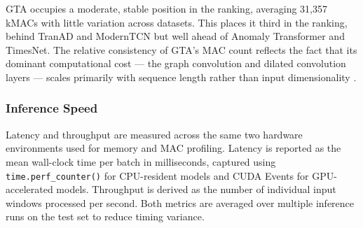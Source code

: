 \documentclass[twoside,11pt,openright]{report}
\begin{document}
GTA \citep{gta2022} occupies a moderate, stable position in the ranking, averaging
31{,}357 kMACs with little variation across datasets. This places it third in the 
ranking, behind TranAD and ModernTCN but well ahead of 
Anomaly Transformer and TimesNet.
The relative consistency of GTA's MAC count reflects the fact that its dominant
computational cost --- the graph convolution and dilated convolution layers
--- scales primarily with sequence length rather than input dimensionality
\citep{gta2022}.

\subsubsection{Inference Speed}
\label{subsubsec:latency_results}

Latency and throughput are measured across the same two hardware environments used
for memory and MAC profiling. Latency is reported as the mean wall-clock time per
batch in milliseconds, captured using \texttt{time.perf\_counter()} for CPU-resident
models and CUDA Events for GPU-accelerated models. Throughput is derived as the number of 
individual input windows processed per second.
Both metrics are averaged over
multiple inference runs on the test set to reduce timing variance.
\end{document}
